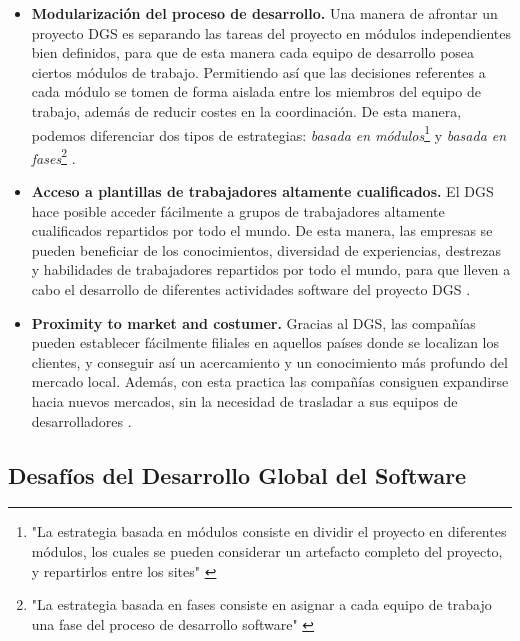 \begin{itemize}
	\item \textbf{Modularización del proceso de desarrollo.} Una manera de afrontar un proyecto DGS es separando las tareas del proyecto en módulos independientes bien definidos, para que de esta manera cada equipo de desarrollo posea ciertos módulos de trabajo. Permitiendo así que las decisiones referentes a cada módulo se tomen de forma aislada entre los miembros del equipo de trabajo, además de reducir costes en la coordinación. De esta manera, podemos diferenciar dos tipos de estrategias: \emph{basada en módulos}\footnote{"La estrategia basada en módulos consiste en dividir el proyecto en diferentes módulos, los cuales se pueden considerar un artefacto completo del proyecto, y repartirlos entre los sites" \cite{piattini2014desarrollo}} y \emph{basada en fases}\footnote{"La estrategia basada en fases consiste en asignar a cada equipo de trabajo una fase del proceso de desarrollo software" \cite{piattini2014desarrollo}} \cite{conchuir2006exploring, conchuir2009global, aagerfalk2008benefits}.
	
	\item \textbf{Acceso a plantillas de trabajadores altamente cualificados.} El DGS hace posible acceder fácilmente a grupos de trabajadores altamente cualificados repartidos por todo el mundo. De esta manera, las empresas se pueden beneficiar de los conocimientos, diversidad de experiencias, destrezas y habilidades de trabajadores repartidos por todo el mundo, para que lleven a cabo el desarrollo de diferentes actividades software del proyecto DGS \cite{vizcaino2015vision, conchuir2006exploring, conchuir2009global, aagerfalk2008benefits}.
	
	\item \textbf{Proximity to market and costumer.} Gracias al DGS, las compañías pueden establecer fácilmente filiales en aquellos países donde se localizan los clientes, y conseguir así un acercamiento y un conocimiento más profundo del mercado local. Además, con esta practica las compañías consiguen expandirse hacia nuevos mercados, sin la necesidad de trasladar a sus equipos de desarrolladores \cite{vizcaino2015vision, conchuir2006exploring, conchuir2009global, aagerfalk2008benefits}.
\end{itemize}

\subsection{Desafíos del Desarrollo Global del Software}
\label{sec:Desafios}

